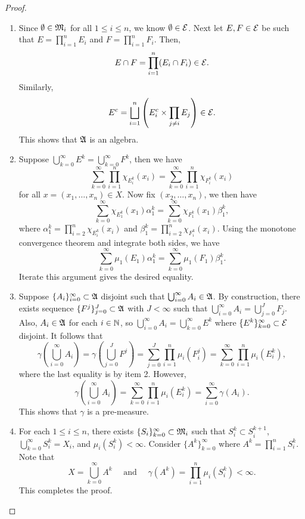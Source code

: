 \documentclass[a4paper]{article}
\renewcommand{\cupinfi}{\bigcup_{i=0}^\infty}
\renewcommand{\suminfi}{\sum_{i=0}^\infty}
\renewcommand{\seqinfi}[1]{\{ #1 \}_{i=0}^\infty}
\renewcommand{\cupinfk}{\bigcup_{k=0}^\infty}
\renewcommand{\suminfk}{\sum_{k=0}^\infty}
\renewcommand{\seqinfk}[1]{\{ #1 \}_{k=0}^\infty}
\renewcommand{\cupj}{\bigcup_{j=0}}
\renewcommand{\sumj}{\sum_{j=0}}
\renewcommand{\seqj}[1]{\{ #1 \}_{j=0}}
\begin{document}
\begin{proof}
  \begin{enumerate}
    \item Since $\emptyset \in \mathfrak{M}_i$ for all $1 \leq i \leq n$, we know
          $\emptyset \in \mathcal{E}$. Next let $E, F \in \mathcal{E}$ be such that $E
          = \prod_{i=1}^n E_i$ and $F = \prod_{i=1}^n F_i$. Then,
          \[
            E \cap F = \prod_{i=1}^n (E_i \cap F_i) \in \mathcal{E}.
          \]
          Similarly,
          \[
            E^c = \bigsqcup_{i=1}^n \left( E_i^c
            \times \prod_{j \neq i} E_j \right) \in \mathcal{E}.
          \]
          This shows that $\mathfrak{A}$ is an algebra.

    \item Suppose $\cupinfk E^k = \cupinfk F^k$, then we have
          \[
            \suminfk \prod_{i=1}^n \chi_{E_i^k}(x_i)
            = \suminfk \prod_{i=1}^n \chi_{F_i^k}(x_i)
          \]
          for all $x = (x_1, \dots, x_n) \in X$. Now fix $(x_2, \dots,
          x_n)$, we then have
          \[
            \suminfk \chi_{E^k_1}(x_1) \alpha_1^k
            = \suminfk \chi_{F^k_1}(x_1) \beta_1^k,
          \]
          where $\alpha_1^k = \prod_{i=2}^n \chi_{E_i^k} (x_i)$ and
          $\beta_1^k = \prod_{i=2}^n \chi_{F_i^k} (x_i)$. Using the
          monotone convergence theorem and integrate both sides, we have
          \[
            \suminfk \mu_1(E_1) \alpha_1^k
            = \suminfk \mu_1(F_1) \beta_1^k.
          \]
          Iterate this argument gives the desired equality.

    \item Suppose $\seqinfi{A_i} \subset \afk$ disjoint such that
          $\cupinfi A_i \in \afk$. By construction, there exists sequence
          $\seqj{F^j}^J \subset \afk$ with $J < \infty$ such that
          $\cupinfi{A_i} = \cupj^J F_j$. Also, $A_i \in \mathfrak{A}$ for each $i
          \in \mathbb{N}$, so $\cupinfi A_i = \cupinfk E^k$ where $\seqinfk{E^k}
          \subset \ecal$ disjoint. It follows that
          \[
            \gamma \left( \cupinfi A_i \right)
            = \gamma \left( \cupj^J F^j \right)
            = \sumj^J \prod_{i=1}^n \mu_i ( F_i^j )
            = \suminfk \prod_{i=1}^n \mu_i (E_i^k),
          \]
          where the last equality is by item 2. However,
          \[
            \gamma \left( \cupinfi A_i \right)
            = \suminfk \prod_{i=1}^n \mu_i (E_i^k)
            = \suminfi \gamma (A_i).
          \]
          This shows that $\gamma$ is a pre-measure.

    \item For each $1 \leq i \leq n$, there exists $\seqinfk{S_i} \subset
          \mf_i$ such that $S_i^k \subset S_i^{k+1}$, $\cupinfk S_i^k =
          X_i$, and $\mu_i(S_i^k) < \infty$. Consider $\seqinfk{A^k}$
          where $A^k = \prod_{i=1}^n S_i^k$. Note that
          \[
            X = \cupinfk A^k \quad \text{ and } \quad
            \gamma(A^k) = \prod_{i=1}^n \mu_i \left( S_i^k \right) < \infty.
          \]
          This completes the proof.

  \end{enumerate}
\end{proof}
\end{document}
